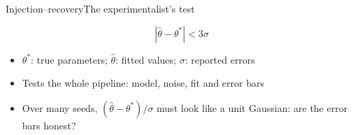 \begin{frame}{Injection--recovery}{The experimentalist's test}
  \vspace{1ex}
  \begin{center}
  \end{center}
  \begin{equation*}
    \left|\hat\theta - \theta^\ast\right| < 3\sigma
  \end{equation*}

  \begin{itemize}
    \item $\theta^\ast$: true parameters; $\hat\theta$: fitted values; $\sigma$: reported errors
    \item<2-> Tests the whole pipeline: model, noise, fit and error bars
    \item<3-> Over many seeds, $(\hat\theta - \theta^\ast)/\sigma$ must look like a unit
          Gaussian: are the error bars honest?
  \end{itemize}
\end{frame}

